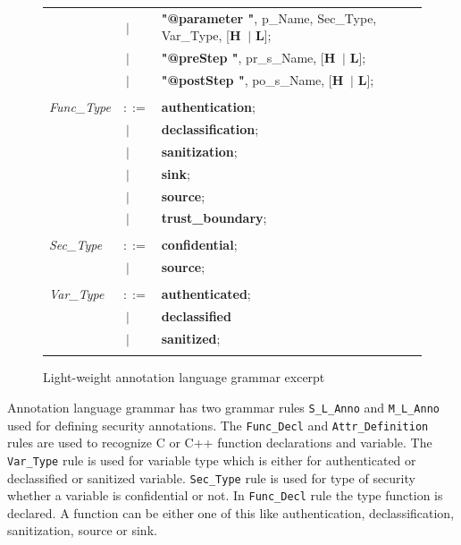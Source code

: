 \begin{figure}[ht!]
\begin{tabular}{lll}
 		&\footnotesize $\ \vert $    &\footnotesize \textbf{"@parameter "},   p\_Name,  Sec\_Type, Var\_Type,    [\textbf{H} $\ \vert $  \textbf{L}];    \\
 		&\footnotesize $\ \vert $    &\footnotesize \textbf{"@preStep "},     pr\_s\_Name,             [\textbf{H} $\ \vert $  \textbf{L}];    \\
 		&\footnotesize $\ \vert $    &\footnotesize \textbf{"@postStep "},    po\_s\_Name,             [\textbf{H} $\ \vert $  \textbf{L}];    \\ \\                                        
 		\footnotesize                       
 		\textit{Func\_Type}          &\footnotesize $::=$        &\footnotesize \textbf{authentication};\\
 		&\footnotesize $\ \vert $ &\footnotesize \textbf{declassification}; \\
 		&\footnotesize $\ \vert $    &\footnotesize \textbf{sanitization};     \\
 		&\footnotesize $\ \vert $    &\footnotesize \textbf{sink};             \\
 		&\footnotesize $\ \vert $    &\footnotesize \textbf{source};           \\
 		&\footnotesize $\ \vert $    &\footnotesize \textbf{trust\_boundary};  \\ \\
 		\footnotesize                       
 		\textit{Sec\_Type}           &\footnotesize $::=$         &\footnotesize \textbf{confidential}; \\
 		&\footnotesize $\ \vert $    &\footnotesize \textbf{source};    \\ \\
 		\footnotesize                       
 		\textit{Var\_Type}           &\footnotesize $::=$         &\footnotesize \textbf{authenticated}; \\
 		&\footnotesize $\ \vert $    &\footnotesize \textbf{declassified}
 		\\
 		&\footnotesize $\ \vert $    &\footnotesize \textbf{sanitized};    \\ \\	
 		
 	\end{tabular}
 	\caption{Light-weight annotation language grammar excerpt}
 	\label{language grammar}
 \end{figure}
 
Annotation language grammar has two grammar rules
\texttt{S\_L\_Anno} and \texttt{M\_L\_Anno} used for defining security annotations. The \texttt{Func\_Decl} and \texttt{Attr\_Definition} rules are used to recognize C or C++ function declarations and variable. The \texttt{Var\_Type} rule is used for variable type which is either for authenticated or declassified or sanitized variable. \texttt{Sec\_Type} rule is used for type of security whether a variable is confidential or not. In \texttt{Func\_Decl} rule the type function is declared. A function can be either one of this like authentication, declassification, sanitization, source or sink.\\



